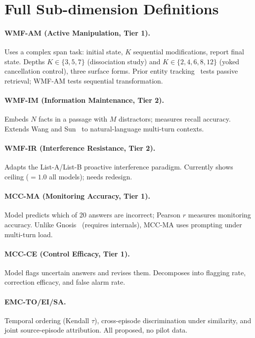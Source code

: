 \documentclass{article}
\begin{document}
\section{Full Sub-dimension Definitions}
\label{app:subdims}

\paragraph{WMF-AM (Active Manipulation, Tier 1).}
Uses a complex span task: initial state, $K$ sequential modifications,
report final state. Depths $K \in \{3,5,7\}$ (dissociation study) and
$K \in \{2,4,6,8,12\}$ (yoked cancellation control), three surface forms.
Prior entity tracking~\citep{entitytracking2023} tests passive retrieval;
WMF-AM tests sequential transformation.

\paragraph{WMF-IM (Information Maintenance, Tier 2).}
Embeds $N$ facts in a passage with $M$ distractors; measures recall
accuracy. Extends Wang and Sun~\citep{wang2025unableforgetproactiveinterference}
to natural-language multi-turn contexts.

\paragraph{WMF-IR (Interference Resistance, Tier 2).}
Adapts the List-A/List-B proactive interference paradigm.
Currently shows ceiling ($= 1.0$ all models); needs redesign.

\paragraph{MCC-MA (Monitoring Accuracy, Tier 1).}
Model predicts which of 20 answers are incorrect; Pearson $r$ measures
monitoring accuracy. Unlike Gnosis~\citep{ghasemabadi2025can} (requires
internals), MCC-MA uses prompting under multi-turn load.

\paragraph{MCC-CE (Control Efficacy, Tier 1).}
Model flags uncertain answers and revises them. Decomposes into flagging
rate, correction efficacy, and false alarm rate.

\paragraph{EMC-TO/EI/SA.}
Temporal ordering (Kendall $\tau$), cross-episode discrimination under
similarity, and joint source-episode attribution. All proposed, no pilot data.
\end{document}
